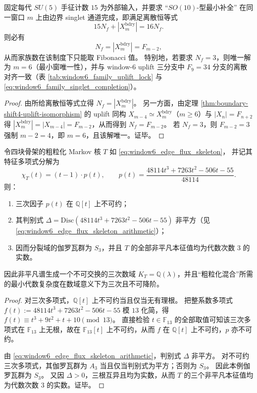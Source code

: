 \begin{theorem}[家族数的窗口量子化与最小窗唯一性：\texorpdfstring{$N_f=|X_m^{\mathrm{bdry}}|$}{Nf=|Xbdry|}]\label{thm:xi-family-number-window-quantization-minimal-window}
固定每代 \(SU(5)\) 手征计数 \(15\) 为外部输入，并要求 “\(SO(10)\)-型最小补全” 在同一窗口 \(m\) 上由边界 singlet 通道完成，即满足离散恒等式
\[
15N_f+|X_m^{\mathrm{bdry}}|=16N_f.
\]
则必有
\[
N_f=|X_m^{\mathrm{bdry}}|=F_{m-2},
\]
从而家族数在该制度下只能取 Fibonacci 值。
特别地，若要求 \(N_f=3\)，则唯一解为 \(m=6\)（最小窗唯一性），并与 window-\(6\) uplift 三分支中 \(F_9=34\) 分支的离散对齐一致（表 \ref{tab:window6_family_uplift_lock} 与 \eqref{eq:window6_family_singlet_completion}）。
\end{theorem}

\begin{proof}
由所给离散恒等式立得 \(N_f=|X_m^{\mathrm{bdry}}|\)。
另一方面，由定理 \ref{thm:boundary-shift4-uplift-isomorphism} 的 uplift 同构 \(X_{m-4}\simeq X_m^{\mathrm{bdry}}\)（\(m\ge 6\)）与 \(|X_n|=F_{n+2}\) 得
\(|X_m^{\mathrm{bdry}}|=|X_{m-4}|=F_{m-2}\)，从而得到 \(N_f=F_{m-2}\)。
若 \(N_f=3\)，则 \(F_{m-2}=3\) 强制 \(m-2=4\)，即 \(m=6\)，且该解唯一。证毕。
\end{proof}

\begin{theorem}\label{thm:xi-window6-four-block-kernel-cubic-field-s3}
令四块骨架的粗粒化 Markov 核 \(T\) 如 \eqref{eq:window6_edge_flux_skeleton}，
并记其特征多项式分解为
\[
\chi_T(t)=(t-1)\cdot p(t),
\qquad
p(t)=\frac{48114t^3+7263t^2-506t-55}{48114}.
\]
则：
\begin{enumerate}
  \item 三次因子 \(p(t)\) 在 \(\mathbb Q[t]\) 上不可约；
  \item 其判别式 \(\Delta=\mathrm{Disc}(48114t^3+7263t^2-506t-55)\) 非平方（见 \eqref{eq:window6_edge_flux_skeleton_arithmetic}）；
  \item 因而分裂域的伽罗瓦群为 \(S_3\)，并且 \(T\) 的全部非平凡本征值均为代数次数 \(3\) 的实数。
\end{enumerate}
因此非平凡谱生成一个不可交换的三次数域 \(K_T=\mathbb Q(\lambda)\)，并且“粗粒化混合”所需的最小代数复杂度在数域意义下为三次且不可降阶。
\end{theorem}

\begin{proof}
对三次多项式，\(\mathbb Q[t]\) 上不可约当且仅当无有理根。
把整系数多项式
\(
f(t):=48114t^3+7263t^2-506t-55
\)
模 \(13\) 化简，得
\(
f(t)\equiv t^3+9t^2+t+10\pmod{13}
\)。
直接检验 \(t\in\mathbb F_{13}\) 的全部取值可知该三次多项式在 \(\mathbb F_{13}\) 上无根，故在 \(\mathbb F_{13}[t]\) 上不可约，从而 \(f\) 在 \(\mathbb Q[t]\) 上不可约，\(p\) 亦不可约。
\par
由 \eqref{eq:window6_edge_flux_skeleton_arithmetic}，判别式 \(\Delta\) 非平方。
对不可约三次多项式，其伽罗瓦群为 \(A_3\) 当且仅当判别式为平方；否则为 \(S_3\)。
因此本例伽罗瓦群为 \(S_3\)。
又因 \(\Delta>0\)，三根互异且均为实数，从而 \(T\) 的三个非平凡本征值均为代数次数 \(3\) 的实数。证毕。
\end{proof}

